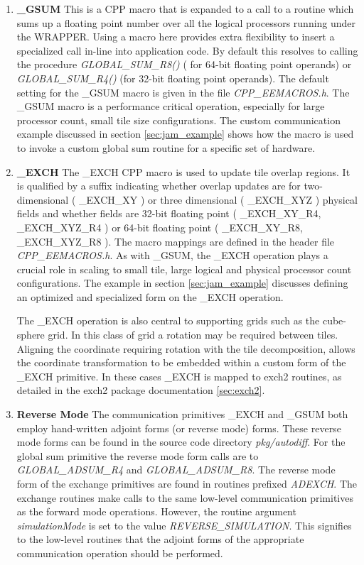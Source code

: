 \begin{enumerate}
\item {\bf \_GSUM}
  This is a CPP macro that is expanded to a call to a routine which
  sums up a floating point number over all the logical processors
  running under the WRAPPER. Using a macro here provides extra
  flexibility to insert a specialized call in-line into application
  code. By default this resolves to calling the procedure {\em
    GLOBAL\_SUM\_R8()} ( for 64-bit floating point operands) or {\em
    GLOBAL\_SUM\_R4()} (for 32-bit floating point operands). The
  default setting for the \_GSUM macro is given in the file {\em
    CPP\_EEMACROS.h}.  The \_GSUM macro is a performance critical
  operation, especially for large processor count, small tile size
  configurations.  The custom communication example discussed in
  section \ref{sec:jam_example} shows how the macro is used to invoke
  a custom global sum routine for a specific set of hardware.

\item {\bf \_EXCH}
  The \_EXCH CPP macro is used to update tile overlap regions.  It is
  qualified by a suffix indicating whether overlap updates are for
  two-dimensional ( \_EXCH\_XY ) or three dimensional ( \_EXCH\_XYZ )
  physical fields and whether fields are 32-bit floating point (
  \_EXCH\_XY\_R4, \_EXCH\_XYZ\_R4 ) or 64-bit floating point (
  \_EXCH\_XY\_R8, \_EXCH\_XYZ\_R8 ). The macro mappings are defined in
  the header file {\em CPP\_EEMACROS.h}. As with \_GSUM, the \_EXCH
  operation plays a crucial role in scaling to small tile, large
  logical and physical processor count configurations.  The example in
  section \ref{sec:jam_example} discusses defining an optimized and
  specialized form on the \_EXCH operation.

  The \_EXCH operation is also central to supporting grids such as the
  cube-sphere grid. In this class of grid a rotation may be required
  between tiles. Aligning the coordinate requiring rotation with the
  tile decomposition, allows the coordinate transformation to be
  embedded within a custom form of the \_EXCH primitive.  In these
  cases \_EXCH is mapped to exch2 routines, as detailed in the exch2
  package documentation \ref{sec:exch2}.

\item {\bf Reverse Mode}
  The communication primitives \_EXCH and \_GSUM both employ
  hand-written adjoint forms (or reverse mode) forms.  These reverse
  mode forms can be found in the source code directory {\em
    pkg/autodiff}.  For the global sum primitive the reverse mode form
  calls are to {\em GLOBAL\_ADSUM\_R4} and {\em GLOBAL\_ADSUM\_R8}.
  The reverse mode form of the exchange primitives are found in
  routines prefixed {\em ADEXCH}. The exchange routines make calls to
  the same low-level communication primitives as the forward mode
  operations. However, the routine argument {\em simulationMode} is
  set to the value {\em REVERSE\_SIMULATION}. This signifies to the
  low-level routines that the adjoint forms of the appropriate
  communication operation should be performed.


\end{enumerate}
